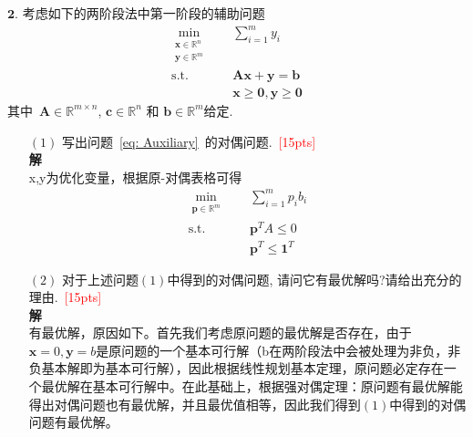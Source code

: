 \documentclass[10pt]{article}
\begin{document}
$\bm{2}.$ 考虑如下的两阶段法中第一阶段的辅助问题
\begin{equation}\label{eq: Auxiliary}
	\begin{aligned}
		\min_{\substack{\bm{x}\in \mathbb{R}^{n}\\\bm{y}\in\mathbb{R}^{m}}}~\quad&\sum_{i=1}^{m}y_i\\
		\textrm{s.t.}~\quad&\bm{A}\bm{x} + \bm{y}= \bm{b}\\
		&\bm{x}\geq \bm{0}, \bm{y} \geq \bm{0}
	\end{aligned}
\end{equation}
其中~$\bm{A}\in\mathbb{R}^{m\times n}$, $\bm{c}\in\mathbb{R}^{n}$ 和 $\bm{b}\in\mathbb{R}^{m}$给定.
\begin{itemize}
	\item[$(1)$] 写出问题~\eqref{eq: Auxiliary}~的对偶问题.~\textcolor{red}{[15pts]}\\
	\textbf{解}\\
	x,y为优化变量，根据原-对偶表格可得
	\begin{equation}
		\begin{aligned}
			\min_{\substack{\bm{p}\in \mathbb{R}^{m}}}~\quad&\sum_{i=1}^{m}p_ib_i\\
			\textrm{s.t.}~\quad& \bm{p}^TA \le 0\\
			&\bm{p}^T\le \bm{1}^T
		\end{aligned}
	\end{equation}
	\item[$(2)$] 对于上述问题$(1)$中得到的对偶问题, 请问它有最优解吗?请给出充分的理由.~\textcolor{red}{[15pts]}\\
	\textbf{解}\\
	有最优解，原因如下。首先我们考虑原问题的最优解是否存在，由于$\bm{x}=0,\bm{y}=b$是原问题的一个基本可行解（b在两阶段法中会被处理为非负，非负基本解即为基本可行解），因此根据线性规划基本定理，原问题必定存在一个最优解在基本可行解中。在此基础上，根据强对偶定理：原问题有最优解能得出对偶问题也有最优解，并且最优值相等，因此我们得到$(1)$中得到的对偶问题有最优解。
\end{itemize}
\end{document}
